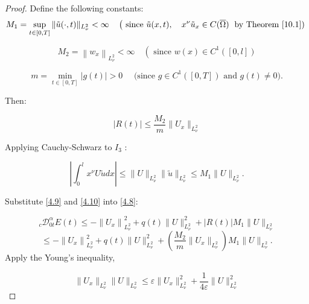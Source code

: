 \documentclass[reqno]{amsart}
\theoremstyle{definition}
\numberwithin{equation}{section}
\begin{document}
\begin{proof}
Define the following constants:
\begin{equation*}
 M_1 =\sup _{t \in[0, T]}\|\tilde{u}(\cdot, t)\|_{L_{\nu}^{2}}<\infty \quad\left(\text { since } \tilde{u}(x,t), \quad x^{\nu}\tilde{u}_x\in C(\overline{\Omega})\right.  \text { by Theorem \ref{10.1}) }   
\end{equation*}

\begin{equation*}
    M_2 =\left\|w_{x}\right\|_{L_{\nu}^{2
    }}<\infty \quad\left(\text { since } w(x) \in C^1([0, l])\right. 
\end{equation*}

\begin{equation*}
    m =\min _{t \in[0, T]}|g(t)|>0 \quad \text { (since } g \in C^1([0, T]) \text { and } g(t) \neq 0).
\end{equation*}

Then:

\begin{equation}\label{4.9}
    |R(t)| \leq \frac{M_2}{m}\|U_x\|_{L_{\nu}^2}
\end{equation}


Applying Cauchy-Schwarz to $I_3$ :

\begin{equation}\label{4.10}
    \left| \int_0^l x^{\nu}U \tilde{u} d x\right| \leq\|U\|_{L_{\nu}^2}\|\tilde{u}\|_{L_{\nu}^2} \leq M_1\|U\|_{L_{\nu}^2} .
\end{equation}


Substitute \eqref{4.9} and \eqref{4.10} into \eqref{4.8}:

\begin{equation*}
 {_c}\mathcal{D}_{0t}^{\alpha} E(t)  \leq -\left\|U_x\right\|_{L_{\nu}^2}^2+q(t)\|U\|_{L_{\nu}^2}^2+|R(t)| M_1\|U\|_{L_{\nu}^2}   
\end{equation*}
\begin{equation*}
    \leq -\left\|U_x\right\|_{L_{\nu}^2}^2+q(t)\|U\|_{L_{\nu}^2}^2+\left(\frac{M_2}{m}\|U_x\|_{L_{\nu}^2}\right) M_1\|U\|_{L_{\nu}^2}.
\end{equation*}
Apply the Young's inequality, 

\begin{equation*}
    \|U_x\|_{L_{\nu}^2}\|U\|_{L_{\nu}^2}\leq \varepsilon\|U_x\|_{L_{\nu}^2}^2+\frac{1}{4\varepsilon}\|U\|_{L_{\nu}^2}^2
\end{equation*}


\end{proof}
\end{document}
